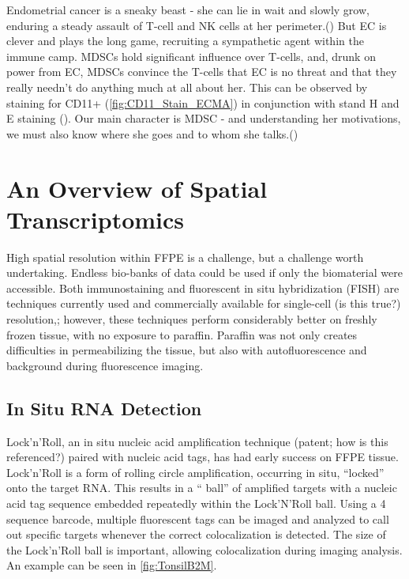 \documentclass[Endo]{subfiles}
\begin{document}
Endometrial cancer is a sneaky beast - she can lie in wait and slowly grow, enduring a steady assault of T-cell and NK cells at her perimeter.(\cite{Souto:2011}) But EC is clever and plays the long game, recruiting a sympathetic agent within the immune camp. MDSCs hold significant influence over T-cells, and, drunk on power from EC, MDSCs convince the T-cells that EC is no threat and that they really needn't do anything much at all about her. This can be observed by staining for CD11+ (\ref{fig:CD11_Stain_ECMA}) in conjunction with stand H and E staining (\cite{fig:H_E_Stain}). Our main character is MDSC - and understanding her motivations, we must also know where she goes and to whom she talks.(\cite{Drag:2015})


\renewcommand{\figName}{CD11_Stain_ECMA}
\renewcommand{\figFile}{\figName}
\hypertarget{\figFile}{}



\renewcommand{\figName}{H_E_Stain_ECMA}
\renewcommand{\figFile}{\figName}
\hypertarget{\figFile}{}



\hypertarget{An-Overview-of-Spatial-Transcriptomics}{}
\section{An Overview of Spatial Transcriptomics}\label{sec:spatial}

High spatial resolution within FFPE is a challenge, but a challenge worth undertaking. Endless bio-banks of data could be used if only the biomaterial were accessible. Both immunostaining and fluorescent in situ hybridization (FISH) are techniques currently used and commercially available for single-cell (is this true?) resolution,; however, these techniques perform considerably better on freshly frozen tissue, with no exposure to paraffin. Paraffin was not only creates difficulties in permeabilizing the tissue, but also with autofluorescence and background during fluorescence imaging.


\hypertarget{In-Situ-RNA-Detection}{}
\subsection{In Situ RNA Detection}\label{subsec:rna}

Lock'n'Roll, an in situ nucleic acid amplification technique (patent; how is this referenced?) paired with nucleic acid tags, has had early success on FFPE tissue. Lock'n'Roll is a form of rolling circle amplification, occurring in situ, ``locked'' onto the target RNA. This results in a `` ball'' of amplified targets with a nucleic acid tag sequence embedded repeatedly within the Lock'N'Roll ball. Using a 4 sequence barcode, multiple fluorescent tags can be imaged and analyzed to call out specific targets whenever the correct colocalization is detected. The size of the Lock'n'Roll ball is important, allowing colocalization during imaging analysis. An example can be seen in \ref{fig:TonsilB2M}.
\end{document}
